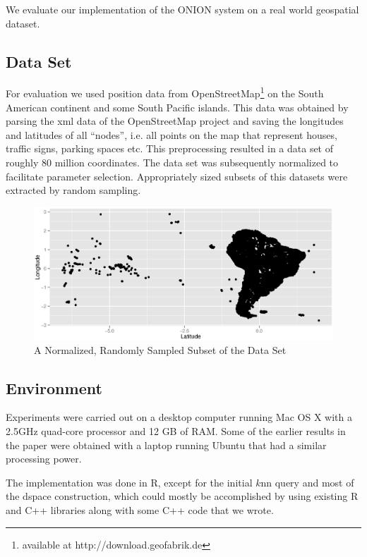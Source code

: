\documentclass[runningheads]{llncs}
\begin{document}
We evaluate our implementation of the ONION system on a real world geospatial dataset.

\subsection{Data Set}
For evaluation we used position data from OpenStreetMap\footnote{available at http://download.geofabrik.de} on the South American continent and some South Pacific islands. This data was obtained by parsing the xml data of the OpenStreetMap project and saving the longitudes and latitudes of all ``nodes'', i.e. all points on the map that represent houses, traffic signs, parking spaces etc. This preprocessing resulted in a data set of roughly 80 million coordinates. The data set was subsequently normalized to facilitate parameter selection. Appropriately sized subsets of this datasets were extracted by random sampling.
\begin{figure}[H]
\includegraphics[width=.68\textwidth]{images/south-america-osm.eps}
\caption{A Normalized, Randomly Sampled Subset of the Data Set}
\end{figure}
\subsection{Environment}
Experiments were carried out on a desktop computer running Mac OS X with a 2.5GHz quad-core processor and 12 GB of RAM. Some of the earlier results in the paper were obtained with a laptop running Ubuntu that had a similar processing power. 

The implementation was done in R, except for the initial $k$nn query and most of the dspace construction, which could mostly be accomplished by using existing R and C++ libraries along with some C++ code that we wrote.
\end{document}
